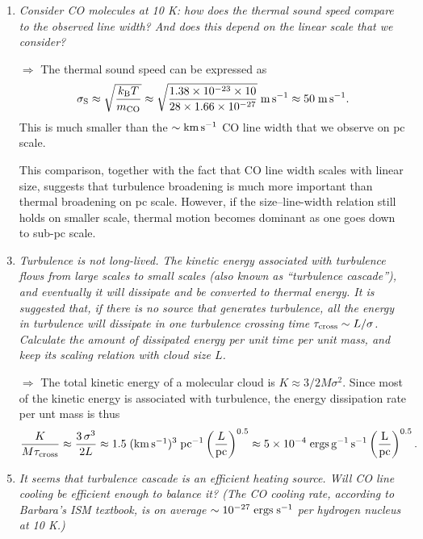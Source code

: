 \documentclass[12pt, letterpaper]{article}
\newcommand{\pc}{\mbox{$\rm pc$}}
\newcommand{\kms}{\mbox{$\rm km\,s^{-1}$}}
\begin{document}
\begin{enumerate}
\item {\it Consider CO molecules at 10 K: how does the thermal sound speed compare to the observed line width? And does this depend on the linear scale that we consider?}

\item[$\Rightarrow$] The thermal sound speed can be expressed as
\begin{align}
    \sigma_{\rm S}
    \approx \sqrt{\frac{k_{\rm B}T}{m_{\rm CO}}}
    \approx \sqrt{\frac{1.38 \times 10^{-23} \times 10}{28 \times 1.66 \times 10^{-27}}}\rm\;m\,s^{-1}
    \approx 50\rm\;m\,s^{-1}.
\end{align}
This is much smaller than the $\sim \kms$ CO line width that we observe on pc scale.

This comparison, together with the fact that CO line width scales with linear size, suggests that turbulence broadening is much more important than thermal broadening on pc scale. However, if the size{--}line-width relation still holds on smaller scale, thermal motion becomes dominant as one goes down to sub-pc scale.

\item {\it Turbulence is not long-lived. The kinetic energy associated with turbulence flows from large scales to small scales (also known as ``turbulence cascade''), and eventually it will dissipate and be converted to thermal energy. It is suggested that, if there is no source that generates turbulence, all the energy in turbulence will dissipate in one turbulence crossing time $\tau_{\rm cross} \sim L/\sigma$. Calculate the amount of dissipated energy per unit time per unit mass, and keep its scaling relation with cloud size $L$.}

\item[$\Rightarrow$] The total kinetic energy of a molecular cloud is $K \approx 3/2M\sigma^2$.
Since most of the kinetic energy is associated with turbulence, the energy dissipation rate per unt mass is thus
\begin{align}
    \frac{K}{M\tau_{\rm cross}}
    \approx \frac{3\,\sigma^3}{2L}
    \approx 1.5\;(\kms)^3\;\pc^{-1} \left(\frac{L}{\pc}\right)^{0.5}
    \approx 5 \times 10^{-4}\rm\;ergs\,g^{-1}\,s^{-1} \left(\frac{L}{\pc}\right)^{0.5}.
\end{align}

\item {\it It seems that turbulence cascade is an efficient heating source. Will CO line cooling be efficient enough to balance it? (The CO cooling rate, according to Barbara's ISM textbook, is on average $\sim 10^{-27}\rm\;ergs\;s^{-1}$ per hydrogen nucleus at 10 K.)}
 

\end{enumerate}
\end{document}
